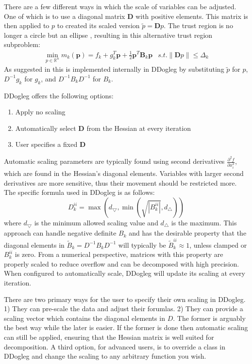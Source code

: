\documentclass[peerreview,onecolumn]{IEEEtran}
\newcommand{\R}{\mathbb{R}}
\newcommand{\norm}[1]{\left\lVert#1\right\rVert}
\newenvironment{enumargin}[1]{\begin{enumerate}[leftmargin=#1\textwidth , rightmargin=#1\textwidth]}{\end{enumerate}}
\begin{document}
There are a few different ways in which the scale of variables can be adjusted. One of which is to use a diagonal matrix $\bm{D}$ with positive elements. This matrix is then applied to $p$ to created its scaled version $\tilde{p} = \bm{D}p$. The trust region is no longer a circle but an ellipse \cite{numopt2006}, resulting in this alternative trust region subproblem:
\begin{equation}
\begin{array}{lr}
\min\limits_{p\in \R^n} m_k(\bm{p}) = f_k + g^T_k \bm{p} + \frac{1}{2}\bm{p}^T \bm{B}_k \bm{p} & s.t. \norm{\bm{D}p} \le \Delta_k
\end{array}
\end{equation}
As suggested in \cite{numopt2006} this is implemented internally in DDogleg by substituting $\tilde{p}$ for $p$, $D^{-1}g_k$ for $g_k$, and $D^{-1}B_k D^{-1}$ for $B_k$.  



DDogleg offers the following options:
\begin{enumargin}{0.2}
\item Apply no scaling
\item Automatically select $\bm{D}$ from the Hessian at every iteration
\item User specifies a fixed $\bm{D}$ 
\end{enumargin}
Automatic scaling parameters are typically found using second derivatives $\frac{\partial^2 f}{\partial x^2_i}$, which are found in the Hessian's diagonal elements. Variables with larger second derivatives are more sensitive, thus their movement should be restricted more. The specific formula used in DDogleg is as follows:
\begin{equation}
D_k^{ii} = \max\left( d_{\bigtriangledown},\min\left( \sqrt{|B_k^{ii}|} , d_{\bigtriangleup} \right)\right)
\end{equation}
where $d_{\bigtriangledown}$ is the minimum allowed scaling value and $d_{\bigtriangleup}$ is the maximum. This approach can handle negative definite $B_k$ and has the desirable property \cite{dennis1996} that the diagonal elements in $\tilde{B}_k = D^{-1}B_k D^{-1}$ will typically be $\tilde{B}_k^{ii} \approx 1$, unless clamped or $B_k^{ii}$ is zero. From a numerical perspective, matrices with this property are properly scaled to reduce overflow and can be decomposed with high precision. When configured to automatically scale, DDogleg will update its scaling at every iteration.

There are two primary ways for the user to specify their own scaling in DDogleg. 1) They can pre-scale the data and adjust their forumlas. 2) They can provide a scaling vector which contains the diagonal elements in $D$. The former is arguably the best way while the later is easier. If the former is done then automatic scaling can still be applied, ensuring that the Hessian matrix is well suited for decomposition. A third option, for advanced users, is to override a class in DDogleg and change the scaling to any arbitrary function you wish.
\end{document}
